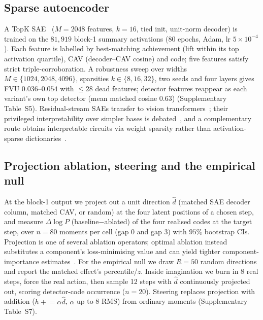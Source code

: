 \documentclass[pdflatex,sn-mathphys-num]{sn-jnl}%
\theoremstyle{thmstyleone}%
\theoremstyle{thmstyletwo}%
\theoremstyle{thmstylethree}%
\begin{document}
\subsection{Sparse autoencoder}\label{m:sae}
A TopK SAE~\cite{gao2024topk} ($M{=}2048$ features, $k{=}16$, tied init, unit-norm decoder) is trained on the $81{,}919$ block-1 summary activations (80 epochs, Adam, lr $5{\times}10^{-4}$). Each feature is labelled by best-matching achievement (lift within its top activation quartile), CAV (decoder--CAV cosine) and code; five features satisfy strict triple-corroboration. A robustness sweep over widths $M\in\{1024,2048,4096\}$, sparsities $k\in\{8,16,32\}$, two seeds and four layers gives FVU $0.036$--$0.054$ with $\le 28$ dead features; detector features reappear as each variant's own top detector (mean matched cosine $0.63$) (Supplementary Table~S5). Residual-stream SAEs transfer to vision transformers~\cite{kim2025rrm}; their privileged interpretability over simpler bases is debated~\cite{ye2025kvmem}, and a complementary route obtains interpretable circuits via weight sparsity rather than activation-sparse dictionaries~\cite{gao2025weightsparse}.

\subsection{Projection ablation, steering and the empirical null}\label{m:ablation}
At the block-1 output we project out a unit direction $\hat d$ (matched SAE decoder column, matched CAV, or random) at the four latent positions of a chosen step, and measure $\Delta\log P$ (baseline$-$ablated) of the four realised codes at the target step, over $n{=}80$ moments per cell (gap 0 and gap 3) with $95\%$ bootstrap CIs. Projection is one of several ablation operators; optimal ablation instead substitutes a component's loss-minimising value and can yield tighter component-importance estimates~\cite{li2024optimalablation}. For the empirical null we draw $R{=}50$ random directions and report the matched effect's percentile/$z$. Inside imagination we burn in 8 real steps, force the real action, then sample 12 steps with $\hat d$ continuously projected out, scoring detector-code occurrence ($n{=}20$). Steering replaces projection with addition ($h\mathrel{+}=\alpha\hat d$, $\alpha$ up to 8 RMS) from ordinary moments (Supplementary Table~S7).
\end{document}
